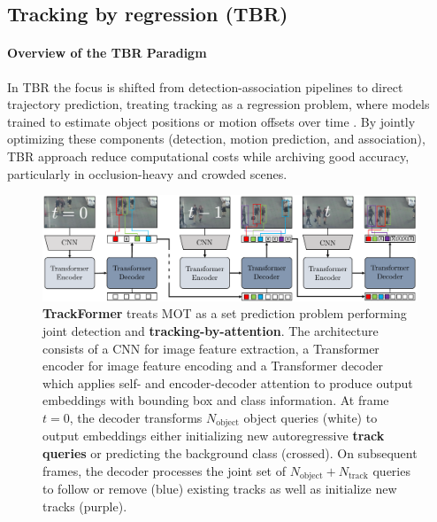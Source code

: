 \documentclass[12pt, a4paper]{article}
\begin{document}
\subsection{Tracking by regression (TBR)}
\label{sec:Tracking_by_regression_TBR}

\paragraph{Overview of the TBR Paradigm}
In TBR the focus is shifted from detection-association pipelines to direct trajectory prediction, treating tracking as a regression problem, where models trained to estimate object positions or motion offsets over time \cite{trackformer, MOTR}. By jointly optimizing these components (detection, motion prediction, and association), TBR approach reduce computational costs while archiving good accuracy, particularly in occlusion-heavy and crowded scenes.

\begin{figure}[h]
    \centering
    \includegraphics[width=0.95\linewidth]{pictures/trackFormer.pdf}
    \caption{\textbf{TrackFormer} treats MOT as a set prediction problem performing joint detection and \textbf{tracking-by-attention}. The architecture consists of a CNN for image feature extraction, a Transformer encoder for image feature encoding and a Transformer decoder which applies self- and encoder-decoder attention to produce output embeddings with bounding box and class information. At frame $t = 0$, the decoder transforms $N_\text{object}$ object queries (white) to output embeddings either initializing new autoregressive \textbf{track queries} or predicting the background class (crossed). On subsequent frames, the decoder processes the joint set of $N_\text{object} + N_\text{track}$ queries to follow or remove (blue) existing tracks as well as initialize new tracks (purple).}
    \label{fig:TrackFormer}
\end{figure}
\end{document}
